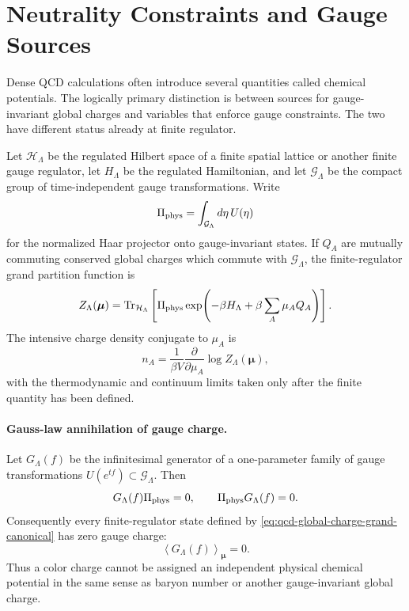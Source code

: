 \section{Neutrality Constraints and Gauge Sources}
\label{sec:qcd-neutrality-gauge-sources}

Dense QCD calculations often introduce several quantities called chemical
potentials.  The logically primary distinction is between sources for
gauge-invariant global charges and variables that enforce gauge constraints.
The two have different status already at finite regulator.

\begin{definition}
\label{def:qcd-finite-regulator-global-charge-ensemble}
Let \(\mathcal H_{\Lambda}\) be the regulated Hilbert space of a finite
spatial lattice or another finite gauge regulator, let \(H_{\Lambda}\) be
the regulated Hamiltonian, and let \(\mathcal G_{\Lambda}\) be the compact
group of time-independent gauge transformations.  Write
\[
  \Pi_{\rm phys}
  =
  \int_{\mathcal G_{\Lambda}}d\eta\,U(\eta)
\]
for the normalized Haar projector onto gauge-invariant states.  If
\(Q_A\) are mutually commuting conserved global charges which commute with
\(\mathcal G_{\Lambda}\), the finite-regulator grand partition function is
\begin{equation}
  Z_{\Lambda}(\boldsymbol\mu)
  =
  \operatorname{Tr}_{\mathcal H_{\Lambda}}
  \left[
    \Pi_{\rm phys}
    \exp\!\left(
      -\beta H_{\Lambda}
      +\beta\sum_A\mu_A Q_A
    \right)
  \right].
  \label{eq:qcd-global-charge-grand-canonical}
\end{equation}
The intensive charge density conjugate to \(\mu_A\) is
\begin{equation}
  n_A
  =
  \frac{1}{\beta V}
  \frac{\partial}{\partial\mu_A}
  \log Z_{\Lambda}(\boldsymbol\mu),
  \label{eq:qcd-global-charge-density}
\end{equation}
with the thermodynamic and continuum limits taken only after the finite
quantity has been defined.
\end{definition}

\paragraph{Gauss-law annihilation of gauge charge.}
Let \(G_{\Lambda}(f)\) be the infinitesimal generator of a one-parameter
family of gauge transformations \(U(e^{tf})\subset\mathcal G_{\Lambda}\).
Then
\begin{equation}
  G_{\Lambda}(f)\Pi_{\rm phys}=0,
  \qquad
  \Pi_{\rm phys}G_{\Lambda}(f)=0.
  \label{eq:qcd-gauss-projector-annihilation}
\end{equation}
Consequently every finite-regulator state defined by
\eqref{eq:qcd-global-charge-grand-canonical} has zero gauge charge:
\begin{equation}
  \left\langle G_{\Lambda}(f)\right\rangle_{\boldsymbol\mu}=0.
  \label{eq:qcd-gauge-charge-expectation-zero}
\end{equation}
Thus a color charge cannot be assigned an independent physical chemical
potential in the same sense as baryon number or another gauge-invariant
global charge.

